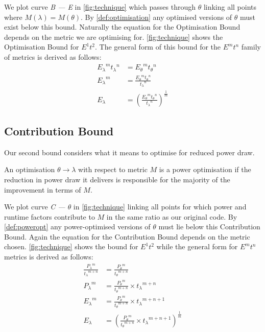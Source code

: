 We plot curve \emph{B --- E} in \autoref{fig:technique} which passes through $\theta$ linking all points where ${M(\lambda) = M(\theta)}$. 
By \autoref{def:optimisation} any optimised versions of $\theta$ must exist below this bound.
Naturally the equation for the Optimisation Bound depends on the metric we are optimising for.
\autoref{fig:technique} shows the Optimisation Bound for $E^1t^2$.
The general form of this bound for the $E^mt^n$ family of metrics is derived as follows:
\begin{align}
 {E_\lambda}^m{t_\lambda}^n &= {E_\theta}^m{t_\theta}^n \nonumber \\
 {E_\lambda}^m &= \frac{{E_\theta}^m{t_\theta}^n}{{t_\lambda}^n} \nonumber \\
  E_\lambda &= (\frac{{E_\theta}^m{t_\theta}^n}{{t_\lambda}^n})^\frac{1}{m}
\label{eq:optimisation}
\end{align}

\subsection{Contribution Bound}
\noindent
Our second bound considers what it means to optimise for reduced power draw.

\vspace{5mm}
\begin{definition}
An optimisation $\theta \to \lambda$ with respect to metric $M$ is a power optimisation if the reduction in power draw it delivers is responsible for the majority of the improvement in terms of $M$.
\label{def:poweropt}
\end{definition}
\vspace{5 mm}

We plot curve \emph{C --- $\theta$} in \autoref{fig:technique} linking all points for which power and runtime factors contribute to $M$ in the same ratio as our original code.
By \autoref{def:poweropt} any power-optimised versions of $\theta$ must lie below this Contribution Bound.
Again the equation for the Contribution Bound depends on the metric chosen. 
\autoref{fig:technique} shows the bound for $E^1t^2$ while the general form for $E^mt^n$ metrics is derived as follows:
\begin{align}
\frac{{P_{\lambda}}^m}{{t_{\lambda}}^{m+n}} &= \frac{{P_{\theta}}^m}{{t_{\theta}}^{m+n}} \nonumber \\
 {P_{\lambda}}^m &= \frac{{P_{\theta}}^m}{{t_{\theta}}^{m+n}} \times {t_\lambda}^{m+n} \nonumber \\ 
 {E_{\lambda}}^m &= \frac{{P_{\theta}}^m}{{t_{\theta}}^{m+n}} \times {t_\lambda}^{m+n+1} \nonumber \\ 
  E_{\lambda} &= (\frac{{P_{\theta}}^m}{{t_{\theta}}^{m+n}} \times {t_\lambda}^{m+n+1})^{\frac{1}{m}} 
\end{align}

